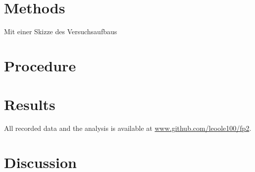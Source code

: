 \documentclass[
    parskip=half, 
    twoside=false,
    twocolumn=true,
    fontsize=11pt,
]{scrarticle}
\begin{document}
\section{Methods}
Mit einer Skizze des Versuchsaufbaus

\section{Procedure}

\pagebreak
\section{Results}

All recorded data and the analysis is available at \url{www.github.com/leoole100/fp2}.

\pagebreak
\section{Discussion}
\end{document}
